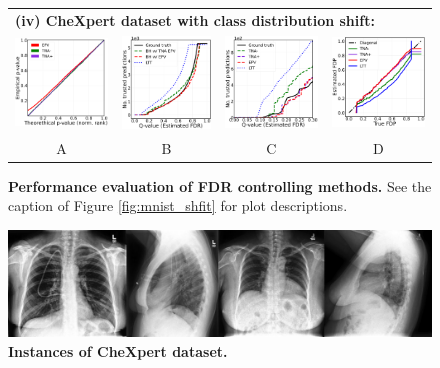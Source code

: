 \documentclass{article}
\begin{document}
\begin{figure}[h!]
\begin{tabular}{cccc}
		\multicolumn{4}{l}{\bf (iv) CheXpert dataset with class distribution shift:}\\	
		\includegraphics[width=0.225\linewidth, height=0.225\linewidth]{img/cnn_QQ_chx_balanced.png} 		&
		\includegraphics[width=0.225\linewidth, height=0.225\linewidth]{img/cnn_chx_balanced_fdr_control.png} & 
		\includegraphics[width=0.225\linewidth, height=0.225\linewidth]{img/cnn_chx_balanced_fdr_control_loc.png} & 
		\includegraphics[width=0.225\linewidth, height=0.225\linewidth]{img/cnn_FDPscat_chx_balanced.png}\\
		A & B & C & D
	\end{tabular}
	\caption{{\bf Performance evaluation of FDR controlling methods.} See the caption of Figure \ref{fig:mnist_shfit} for plot descriptions. }
	\label{fig:I}
\end{figure} 

\begin{figure}[h!]
	\centering
	\includegraphics[width=5.in]{img/chx.png}
	\caption{{\bf Instances of CheXpert dataset.}}
	\label{fig:CheXpert_example}
\end{figure} 
\end{document}
